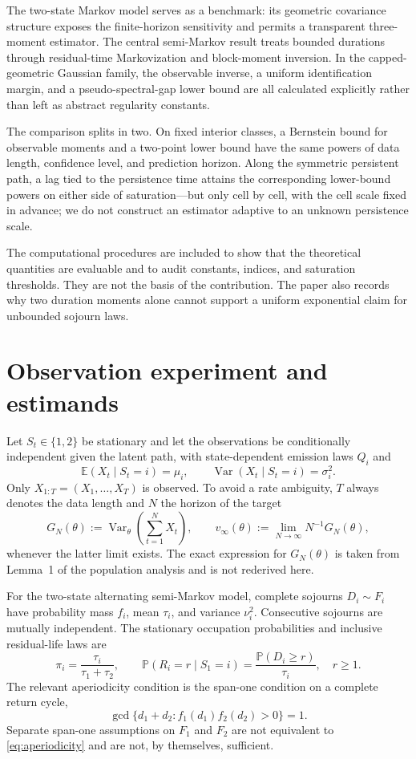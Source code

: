 \documentclass[11pt]{article}
\theoremstyle{definition}
\theoremstyle{remark}
\newcommand{\E}{\mathbb E}
\newcommand{\Pp}{\mathbb P}
\newcommand{\Var}{\operatorname{Var}}
\begin{document}
The two-state Markov model serves as a benchmark: its geometric covariance
structure exposes the finite-horizon sensitivity and permits a transparent
three-moment estimator.  The central semi-Markov result treats bounded
durations through residual-time Markovization and block-moment inversion.  In
the capped-geometric Gaussian family, the observable inverse, a uniform
identification margin, and a pseudo-spectral-gap lower bound are all calculated
explicitly rather than left as abstract regularity constants.

The comparison splits in two.  On fixed interior classes, a Bernstein bound
for observable moments and a two-point lower bound have the same powers of
data length, confidence level, and prediction horizon.  Along the symmetric
persistent path, a lag tied to the persistence time attains the corresponding
lower-bound powers on either side of saturation---but only cell by cell, with
the cell scale fixed in advance; we do not construct an estimator adaptive to
an unknown persistence scale.

The computational procedures are included to show that the theoretical
quantities are evaluable and to audit constants, indices, and saturation
thresholds.  They are not the basis of the contribution.  The paper also
records why two duration moments alone cannot support a uniform exponential
claim for unbounded sojourn laws.

\section{Observation experiment and estimands}

Let $S_t\in\{1,2\}$ be stationary and let the observations be conditionally
independent given the latent path, with state-dependent emission laws $Q_i$ and
\[
 \E(X_t\mid S_t=i)=\mu_i,
 \qquad \Var(X_t\mid S_t=i)=\sigma_i^2.
\]
Only $X_{1:T}=(X_1,\ldots,X_T)$ is observed.  To avoid a rate ambiguity, $T$
always denotes the data length and $N$ the horizon of the target
\[
 G_N(\theta):=\Var_\theta\!\left(\sum_{t=1}^N X_t\right),
 \qquad
 v_\infty(\theta):=\lim_{N\to\infty}N^{-1}G_N(\theta),
\]
whenever the latter limit exists.  The exact expression for $G_N(\theta)$ is
taken from Lemma~1 of the population analysis and is not rederived here.

For the two-state alternating semi-Markov model, complete sojourns
$D_i\sim F_i$ have probability mass $f_i$, mean $\tau_i$, and variance
$\nu_i^2$.  Consecutive sojourns are mutually independent.  The stationary
occupation probabilities and inclusive residual-life laws are
\begin{equation}
 \pi_i=\frac{\tau_i}{\tau_1+\tau_2},
 \qquad
 \Pp(R_i=r\mid S_1=i)=\frac{\Pp(D_i\ge r)}{\tau_i},\quad r\ge1.
 \label{eq:equilibrium}
\end{equation}
The relevant aperiodicity condition is the span-one condition on a complete
return cycle,
\begin{equation}
 \gcd\{d_1+d_2:f_1(d_1)f_2(d_2)>0\}=1.
 \label{eq:aperiodicity}
\end{equation}
Separate span-one assumptions on $F_1$ and $F_2$ are not equivalent to
\eqref{eq:aperiodicity} and are not, by themselves, sufficient.
\end{document}
